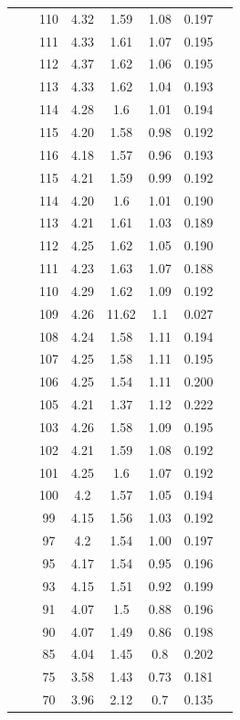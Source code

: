\documentclass[a4paper]{article}
\begin{document}
\begin{table}[htb]
\begin{tabular}{@{}cccccccc@{}}
         &  & 110 & 4.32 & 1.59 & 1.08 & 0.197 &  \\
         &  & 111 & 4.33 & 1.61 & 1.07 & 0.195 &  \\
         &  & 112 & 4.37 & 1.62 & 1.06 & 0.195 &  \\
         &  & 113 & 4.33 & 1.62 & 1.04 & 0.193 &  \\
         &  & 114 & 4.28 & 1.6 & 1.01 & 0.194 &  \\
         &  & 115 & 4.20 & 1.58 & 0.98 & 0.192 &  \\
         &  & 116 & 4.18 & 1.57 & 0.96 & 0.193 &  \\
         &  & 115 & 4.21 & 1.59 & 0.99 & 0.192 &  \\
         &  & 114 & 4.20 & 1.6 & 1.01 & 0.190 &  \\
         &  & 113 & 4.21 & 1.61 & 1.03 & 0.189 &  \\
         &  & 112 & 4.25 & 1.62 & 1.05 & 0.190 &  \\
         &  & 111 & 4.23 & 1.63 & 1.07 & 0.188 &  \\
         &  & 110 & 4.29 & 1.62 & 1.09 & 0.192 &  \\
         &  & 109 & 4.26 & 11.62 & 1.1 & 0.027 &  \\
         &  & 108 & 4.24 & 1.58 & 1.11 & 0.194 &  \\
         &  & 107 & 4.25 & 1.58 & 1.11 & 0.195 &  \\
         &  & 106 & 4.25 & 1.54 & 1.11 & 0.200 &  \\
         &  & 105 & 4.21 & 1.37 & 1.12 & 0.222 &  \\
         &  & 103 & 4.26 & 1.58 & 1.09 & 0.195 &  \\
         &  & 102 & 4.21 & 1.59 & 1.08 & 0.192 &  \\
         &  & 101 & 4.25 & 1.6 & 1.07 & 0.192 &  \\
         &  & 100 & 4.2 & 1.57 & 1.05 & 0.194 &  \\
         &  & 99 & 4.15 & 1.56 & 1.03 & 0.192 &  \\
         &  & 97 & 4.2 & 1.54 & 1.00 & 0.197 &  \\
         &  & 95 & 4.17 & 1.54 & 0.95 & 0.196 &  \\
         &  & 93 & 4.15 & 1.51 & 0.92 & 0.199 &  \\
         &  & 91 & 4.07 & 1.5 & 0.88 & 0.196 &  \\
         &  & 90 & 4.07 & 1.49 & 0.86 & 0.198 &  \\
         &  & 85 & 4.04 & 1.45 & 0.8 & 0.202 &  \\
         &  & 75 & 3.58 & 1.43 & 0.73 & 0.181 &  \\
         &  & 70 & 3.96 & 2.12 & 0.7 & 0.135 &  \\
        \bottomrule
    \end{tabular}
\end{table}
\end{document}
